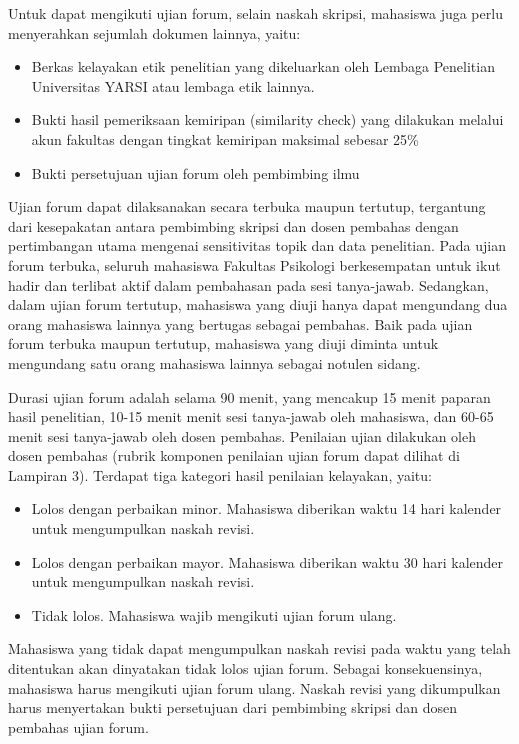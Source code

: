 \documentclass[
  indonesian,
  letterpaper,
]{scrbook}
\providecommand{\tightlist}{%
  \setlength{\itemsep}{0pt}\setlength{\parskip}{0pt}}
\begin{document}
Untuk dapat mengikuti ujian forum, selain naskah skripsi, mahasiswa juga
perlu menyerahkan sejumlah dokumen lainnya, yaitu:

\begin{itemize}
\tightlist
\item
  Berkas kelayakan etik penelitian yang dikeluarkan oleh Lembaga
  Penelitian Universitas YARSI atau lembaga etik lainnya.
\item
  Bukti hasil pemeriksaan kemiripan (similarity check) yang dilakukan
  melalui akun fakultas dengan tingkat kemiripan maksimal sebesar 25\%
\item
  Bukti persetujuan ujian forum oleh pembimbing ilmu
\end{itemize}

Ujian forum dapat dilaksanakan secara terbuka maupun tertutup,
tergantung dari kesepakatan antara pembimbing skripsi dan dosen pembahas
dengan pertimbangan utama mengenai sensitivitas topik dan data
penelitian. Pada ujian forum terbuka, seluruh mahasiswa Fakultas
Psikologi berkesempatan untuk ikut hadir dan terlibat aktif dalam
pembahasan pada sesi tanya-jawab. Sedangkan, dalam ujian forum tertutup,
mahasiswa yang diuji hanya dapat mengundang dua orang mahasiswa lainnya
yang bertugas sebagai pembahas. Baik pada ujian forum terbuka maupun
tertutup, mahasiswa yang diuji diminta untuk mengundang satu orang
mahasiswa lainnya sebagai notulen sidang.

Durasi ujian forum adalah selama 90 menit, yang mencakup 15 menit
paparan hasil penelitian, 10-15 menit menit sesi tanya-jawab oleh
mahasiswa, dan 60-65 menit sesi tanya-jawab oleh dosen pembahas.
Penilaian ujian dilakukan oleh dosen pembahas (rubrik komponen penilaian
ujian forum dapat dilihat di Lampiran 3). Terdapat tiga kategori hasil
penilaian kelayakan, yaitu:

\begin{itemize}
\tightlist
\item
  Lolos dengan perbaikan minor. Mahasiswa diberikan waktu 14 hari
  kalender untuk mengumpulkan naskah revisi.
\item
  Lolos dengan perbaikan mayor. Mahasiswa diberikan waktu 30 hari
  kalender untuk mengumpulkan naskah revisi.
\item
  Tidak lolos. Mahasiswa wajib mengikuti ujian forum ulang.
\end{itemize}

Mahasiswa yang tidak dapat mengumpulkan naskah revisi pada waktu yang
telah ditentukan akan dinyatakan tidak lolos ujian forum. Sebagai
konsekuensinya, mahasiswa harus mengikuti ujian forum ulang. Naskah
revisi yang dikumpulkan harus menyertakan bukti persetujuan dari
pembimbing skripsi dan dosen pembahas ujian forum.
\end{document}
